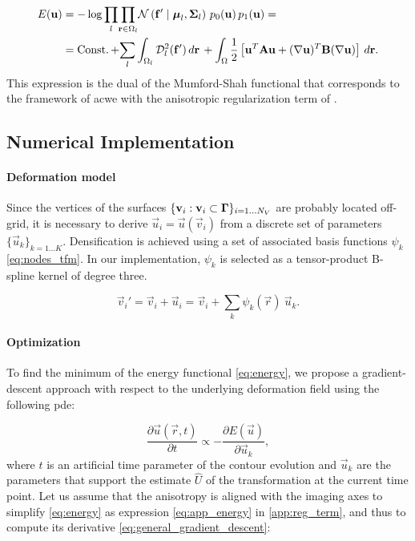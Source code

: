   \begin{align}
  E(\vec{u}) &= -\log \underset{l}{\prod}
  \underset{\vec{r} \in \Omega_l}{\prod}
  \mathcal{N} \left( \vec{f}' \mid \boldsymbol{\mu}_l, \boldsymbol{\Sigma}_l \right)\,p_0( \vec{u})\,p_1( \vec{u}) = \notag\\ &=
  \const + \underset{l}{\sum} \int_{\Omega_l} \mdist{f'}{l} \,d\vec{r} \, +   \int_{\Omega} \frac12 \left[ \vec{u}^T \mathbf{A} \vec{u} + (\nabla \vec{u})^T \mathbf{B} (\nabla \vec{u}) \right] \,d\vec{r}.
  \label{eq:energy}
  \end{align}
This expression is the dual of the Mumford-Shah functional that corresponds
  to the framework of \acrlong*{acwe} \citep{chan_active_2001}
  with the anisotropic regularization term of \cite{nagel_investigation_1986}.


\subsection{Numerical Implementation}
\label{sec:numerical_implementation}

\paragraph*{Deformation model}\label{sec:deformation_model}
Since the vertices of the surfaces $\{\mathbf{v}_i: \mathbf{v}_i \subset \boldsymbol{\Gamma} \}_{i=1 \ldots N_V}$
  are probably located off-grid, it is necessary to derive $\vec{u}_i = \vec{u}(\vec{v}_i)$ from a discrete set of parameters
  $\{\vec{u}_k\}_{k=1 \ldots K}$.
Densification is achieved using a set of associated basis functions $\psi_k$ \eqref{eq:nodes_tfm}.
In our implementation, $\psi_k$ is selected as a tensor-product B-spline kernel
  of degree three.

  \begin{equation}
  \vec{v}_i' = \vec{v}_i + \vec{u}_i = \vec{v}_i + \sum_k \psi_k(\vec{r}) \: \vec{u}_k.
  \label{eq:nodes_tfm}
  \end{equation}


\paragraph*{Optimization}
\label{sec:gradient_descent}
To find the minimum of the energy functional \eqref{eq:energy},
  we propose a gradient-descent approach with respect to the underlying
  deformation field using the following \gls*{pde}:

  \begin{equation}
  \frac{\partial \vec{u}(\vec{r},t)}{\partial t} \propto - \frac{\partial E(\vec{u})}{\partial \vec{u}_k},
  \label{eq:general_gradient_descent}
  \end{equation}
  where $t$ is an artificial time parameter of the contour
  evolution and $\vec{u}_k$ are the parameters that support the estimate
  $\hat{U}$ of the transformation at the current time point.
Let us assume that the anisotropy is aligned with the imaging axes to simplify
  \eqref{eq:energy} as expression \eqref{eq:app_energy} in \ref{app:reg_term},
  and thus to compute its derivative \eqref{eq:general_gradient_descent}:

